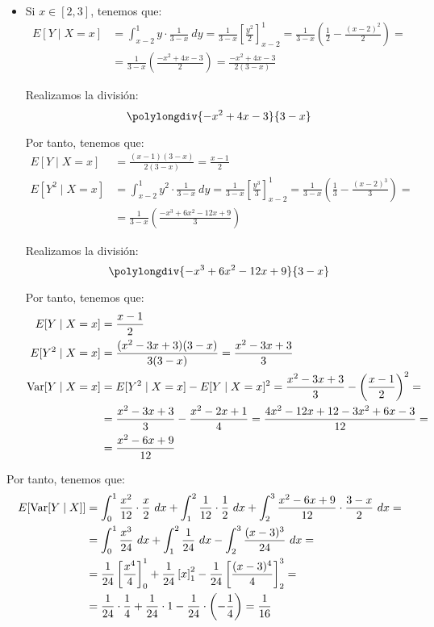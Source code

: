 \begin{ejercicio}
\begin{itemize}
        \item Si $x\in [2,3]$, tenemos que:
        \begin{align*}
            E[Y\mid X=x] &= \int_{x-2}^{1} y\cdot \frac{1}{3-x} \ dy
            = \frac{1}{3-x}\left[\frac{y^2}{2}\right]_{x-2}^{1}
            = \frac{1}{3-x}\left(\frac{1}{2}-\frac{(x-2)^2}{2}\right)
            =\\&= \frac{1}{3-x}\left(\frac{-x^2+4x-3}{2}\right)
            = \frac{-x^2+4x-3}{2(3-x)}
        \end{align*}

        Realizamos la división:
        $$\polylongdiv{-x^2+4x-3}{3-x}$$

        Por tanto, tenemos que:
        \begin{align*}
            E[Y\mid X=x] &= \frac{(x-1)(3-x)}{2(3-x)} = \frac{x-1}{2}\\
            E[Y^2\mid X=x] &= \int_{x-2}^{1} y^2\cdot \frac{1}{3-x} \ dy
            = \frac{1}{3-x}\left[\frac{y^3}{3}\right]_{x-2}^{1}
            = \frac{1}{3-x}\left(\frac{1}{3}-\frac{(x-2)^3}{3}\right)
            =\\&= \frac{1}{3-x}\left(\frac{-x^3+6x^2-12x+9}{3}\right)
        \end{align*}

        Realizamos la división:
        $$\polylongdiv{-x^3+6x^2-12x+9}{3-x}$$

        Por tanto, tenemos que:
        \begin{align*}
            E[Y\mid X=x] &= \frac{x-1}{2}\\
            E[Y^2\mid X=x] &= \frac{(x^2-3x+3)(3-x)}{3(3-x)} = \frac{x^2-3x+3}{3} \\
            \operatorname{Var}[Y\mid X=x] &= E[Y^2\mid X=x]-E[Y\mid X=x]^2
            = \frac{x^2-3x+3}{3}-\left(\frac{x-1}{2}\right)^2
            =\\&= \frac{x^2-3x+3}{3}-\frac{x^2-2x+1}{4}
            = \frac{4x^2-12x+12-3x^2+6x-3}{12}
            =\\&= \frac{x^2-6x+9}{12}
        \end{align*}
    \end{itemize}

    Por tanto, tenemos que:
    \begin{align*}
        E[\operatorname{Var}[Y\mid X]] &= \int_{0}^{1} \frac{x^2}{12}\cdot \frac{x}{2} \ dx + \int_{1}^{2} \frac{1}{12}\cdot \frac{1}{2} \ dx + \int_{2}^{3} \frac{x^2-6x+9}{12}\cdot \frac{3-x}{2} \ dx
        =\\&= \int_{0}^{1} \frac{x^3}{24} \ dx + \int_{1}^{2} \frac{1}{24} \ dx - \int_{2}^{3} \frac{(x-3)^3}{24} \ dx
        =\\&= \frac{1}{24}\left[\frac{x^4}{4}\right]_{0}^{1} + \frac{1}{24}\left[x\right]_{1}^{2} - \frac{1}{24}\left[\frac{(x-3)^4}{4}\right]_{2}^{3}
        =\\&= \frac{1}{24}\cdot \frac{1}{4} + \frac{1}{24}\cdot 1 - \frac{1}{24}\cdot \left(-\frac{1}{4}\right)
        = \frac{1}{16}
    \end{align*}


\end{ejercicio}
